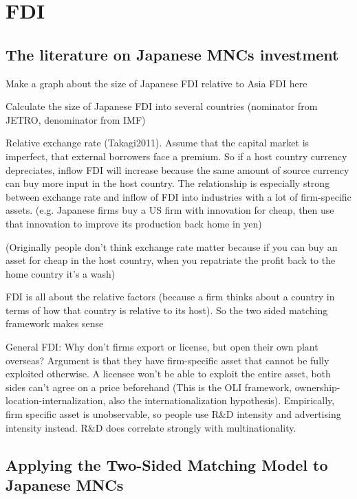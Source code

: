 \chapter{FDI}
\label{chap:FDI}


\section{The literature on Japanese MNCs investment}

Make a graph about the size of Japanese FDI relative to Asia FDI here

Calculate the size of Japanese FDI into several countries (nominator from JETRO,
denominator from IMF)

Relative exchange rate (Takagi2011). Assume that the capital market is
imperfect, that external borrowers face a premium. So if a host country currency
depreciates, inflow FDI will increase because the same amount of source currency
can buy more input in the host country. The relationship is especially strong
between exchange rate and inflow of FDI into industries with a lot of
firm-specific assets. (e.g. Japanese firms buy a US firm with innovation for
cheap, then use that innovation to improve its production back home in yen)

(Originally people don't think exchange rate matter because if you can buy an
asset for cheap in the host country, when you repatriate the profit back to the
home country it's a wash)

FDI is all about the relative factors (because a firm thinks about a country in
terms of how that country is relative to its host). So the two sided matching
framework makes sense

General FDI: Why don't firms export or license, but open their own plant
overseas? Argument is that they have firm-specific asset that cannot be fully
exploited otherwise. A licensee won't be able to exploit the entire asset, both
sides can't agree on a price beforehand (This is the OLI framework,
ownership-location-internalization, also the internationalization hypothesis).
Empirically, firm specific asset is unobservable, so people use R\&D intensity
and advertising intensity instead. R\&D does correlate strongly with
multinationality.


\section{Applying the Two-Sided Matching Model to Japanese MNCs}
\label{sec:application}

